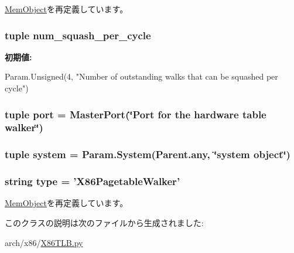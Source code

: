\hyperlink{classMemObject_1_1MemObject_a17da7064bc5c518791f0c891eff05fda}{MemObject}を再定義しています。\hypertarget{classX86TLB_1_1X86PagetableWalker_a6fedb4107249699f51b624cf7677475c}{
\subsubsection[{num\_\-squash\_\-per\_\-cycle}]{\setlength{\rightskip}{0pt plus 5cm}tuple {\bf num\_\-squash\_\-per\_\-cycle}}}
\label{classX86TLB_1_1X86PagetableWalker_a6fedb4107249699f51b624cf7677475c}
{\bfseries 初期値:}
\begin{DoxyCode}
Param.Unsigned(4,
            "Number of outstanding walks that can be squashed per cycle")
\end{DoxyCode}
\hypertarget{classX86TLB_1_1X86PagetableWalker_a1aadf525515ecfcf662c2aa51a503763}{
\subsubsection[{port}]{\setlength{\rightskip}{0pt plus 5cm}tuple {\bf port} = {\bf MasterPort}(\char`\"{}Port for the hardware table walker\char`\"{})}}
\label{classX86TLB_1_1X86PagetableWalker_a1aadf525515ecfcf662c2aa51a503763}
\hypertarget{classX86TLB_1_1X86PagetableWalker_ab737471139f5a296e5b26e8a0e1b0744}{
\subsubsection[{system}]{\setlength{\rightskip}{0pt plus 5cm}tuple {\bf system} = Param.System(Parent.any, \char`\"{}system object\char`\"{})}}
\label{classX86TLB_1_1X86PagetableWalker_ab737471139f5a296e5b26e8a0e1b0744}
\hypertarget{classX86TLB_1_1X86PagetableWalker_acce15679d830831b0bbe8ebc2a60b2ca}{
\subsubsection[{type}]{\setlength{\rightskip}{0pt plus 5cm}string {\bf type} = '{\bf X86PagetableWalker}'}}
\label{classX86TLB_1_1X86PagetableWalker_acce15679d830831b0bbe8ebc2a60b2ca}


\hyperlink{classMemObject_1_1MemObject_acce15679d830831b0bbe8ebc2a60b2ca}{MemObject}を再定義しています。

このクラスの説明は次のファイルから生成されました:\begin{DoxyCompactItemize}
\item 
arch/x86/\hyperlink{X86TLB_8py}{X86TLB.py}\end{DoxyCompactItemize}
